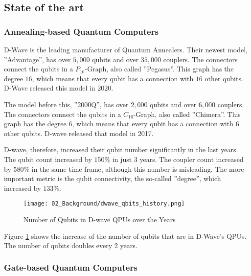 


\subsection{State of the art}

\subsubsection{Annealing-based Quantum Computers}

D-Wave is the leading manufacturer of Quantum Annealers.
Their newest model, ''Advantage'', has over $5, 000$ qubits and over $35, 000$ couplers.
The connectors connect the qubits in a $P_{16}$-Graph, also called ''Pegasus''.
This graph has the degree $16$, which means that every qubit has a connection with $16$ other qubits.
D-Wave released this model in 2020.
\cite{D-Wave2020, Zbinden2020}

The model before this, ''2000Q'', has over $2, 000$ qubits and over $6, 000$ couplers.
The connectors connect the qubits in a $C_{16}$-Graph, also called ''Chimera''.
This graph has the degree $6$, which means that every qubit has a connection with $6$ other qubits.
D-wave released that model in 2017.
\cite{D-Wave2020, Zbinden2020}

D-wave, therefore, increased their qubit number significantly in the last years.
The qubit count increased by $150\%$ in just $3$ years.
The coupler count increased by $580\%$ in the same time frame, although this number is misleading.
The more important metric is the qubit connectivity, the so-called ''degree'', which increased by $133\%$.

\begin{figure}[!h]
  \centering
  \texttt{[image: 02\_Background/dwave\_qbits\_history.png]}
  \caption{Number of Qubits in D-wave QPUs over the Years \cite{D-Wave2018, D-Wave2020}}
  \label{figure:annealing.processors.history}
\end{figure}

Figure \ref{figure:annealing.processors.history} shows the increase of the number of qubits that are in D-Wave's QPUs.
The number of qubits doubles every $2$ years.

\subsubsection{Gate-based Quantum Computers}

